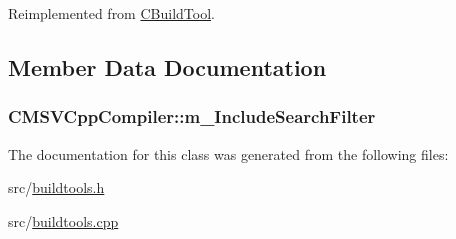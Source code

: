 Reimplemented from \hyperlink{classCBuildTool_ad07fcd46ccc841bc131d65505e5343c1}{C\-Build\-Tool}.



\subsection{Member Data Documentation}
\hypertarget{classCMSVCppCompiler_ac559c23d7be2807dd5a2a531455eab71}{
\subsubsection[{m\-\_\-\-Include\-Search\-Filter}]{ C\-M\-S\-V\-Cpp\-Compiler\-::m\-\_\-\-Include\-Search\-Filter\hspace{0.3cm}{\ttfamily [private]}}}\label{classCMSVCppCompiler_ac559c23d7be2807dd5a2a531455eab71}


The documentation for this class was generated from the following files\-:\begin{DoxyCompactItemize}
\item 
src/\hyperlink{buildtools_8h}{buildtools.\-h}\item 
src/\hyperlink{buildtools_8cpp}{buildtools.\-cpp}\end{DoxyCompactItemize}
